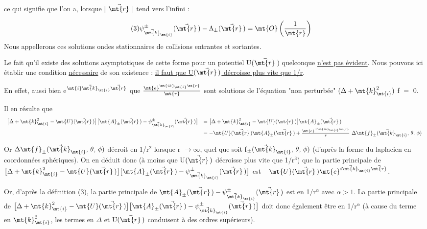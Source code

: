 ce qui signifie que l'on a, lorsque | $\vec{\mt{r}}$ | tend vers l'infini :

\[
\tag{3}\psi_{\vec{\mt{k}}_\mt{i}}^\pm(\vec{\mt{r}}\,)-\Lambda_\pm(\vec{\mt{r}}\,)=\mt{O}\left(\frac{1}{\mt{r}}\right)
\]
Nous appellerons ces solutions ondes stationnaires de collisions entrantes
et sortantes.

Le fait qu'il existe des solutions asymptotiques de cette forme pour un
potentiel U($\vec{\mt{r}}\,$) quelconque \ul{n'est pas évident}. Nous pouvons ici
établir une condition \ul{nécessaire} de son existence : \ul{il faut que U$(\vec{\mt{r}}\,)$ décroisse plus vite que 1/r}.

En effet, aussi bien e$^{\mt{i}\vec{\mt{k}}_\mt{i}\vec{\mt{r}}}$ que
$\frac{\mt{e}^{\mt{i k}_\mt{i}\mt{r}}}{\mt{r}}$ sont solutions de
l'équation "non perturbée" $(\Delta+\mt{k}_\mt{i}^2)$ f $=$ 0.


Il en résulte que
\[
\begin{array}{rl}
\big[\Delta+\mt{k}_\mt{i}^2-\mt{U}(\vec{\mt{r}}\,)\big] \big[\mt{A}_\pm(\vec{\mt{r}}\,)-\psi_{\vec{\mt{k}}_\mt{i}}^\pm(\vec{\mt{r}}\,)\big] & = \big[\Delta+\mt{k}_\mt{i}^2-\mt{U}(\mt{r}\,)\big]\mt{A}_\pm(\vec{\mt{r}}\,) \\
 & =-\mt{U}(\vec{\mt{r}}\,)\mt{A}_\pm(\vec{\mt{r}}\,) + \frac{\mt{e}^{\pm\mt{i k}_\mt{i}\mt{r}}}{r}\ \Delta\mt{f}_\pm(\vec{\mt{k}}_\mt{i},\,\theta,\,\phi)
\end{array}
\]

Or $\Delta\mt{f}_\pm(\vec{\mt{k}}_\mt{i},\,\theta,\,\phi)$ décroit en 1/r$^2$ lorsque r $\to\infty$, quel que soit
f$_\pm(\vec{\mt{k}}_\mt{i},\,\theta,\,\phi)$ (d'après la forme du laplacien en coordonnées sphériques).
On en déduit donc (à moins que U$(\vec{\mt{r}}\,)$ décroisse plus vite que 1/r$^3$) que
la partie principale de $\big[\Delta+\mt{k}_\mt{i}^2-\mt{U}(\vec{\mt{r}}\,)\big] \big[\mt{A}_\pm(\vec{\mt{r}}\,)-\psi_{\vec{\mt{k}}_\mt{i}}^\pm(\vec{\mt{r}}\,)\big]$ est $-\mt{U}(\vec{\mt{r}}\,)\mt{e}^{i\vec{\mt{k}}_\mt{i}\vec{\mt{r}}}$.

Or, d'après la définition (3), la partie principale de
$\mt{A}_\pm(\vec{\mt{r}}\,)-\psi_{\vec{\mt{k}}_\mt{i}}^\pm(\vec{\mt{r}}\,)$
 est en 1/r$^\alpha$ avec $\alpha>1$. La partie principale de
$\big[\Delta+\mt{k}_\mt{i}^2-\mt{U}(\vec{\mt{r}}\,)\big] \big[\mt{A}_\pm(\vec{\mt{r}}\,)-\psi_{\vec{\mt{k}}_\mt{i}}^\pm(\vec{\mt{r}}\,)\big]$
doit donc également être en 1/r$^\alpha$
(à cause du terme en $\mt{k}_\mt{i}^2$, les termes en $\Delta$ et U$(\vec{\mt{r}}\,)$ conduisent à des
ordres supérieurs).

